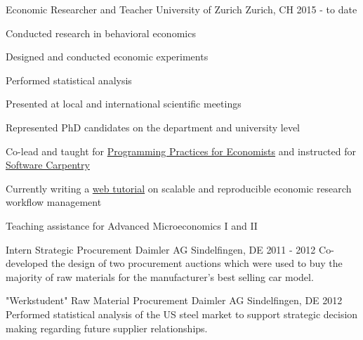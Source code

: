
\begin{section}[Experience]

  \entry%
  {Economic Researcher and Teacher} %
  {University of Zurich} %
  {Zurich, CH} %
  {2015 - to date} %
  {%
    \begin{entrylist}
      \item Conducted research in behavioral economics
      \item Designed and conducted economic experiments
      \item Performed statistical analysis
      \item Presented at local and international scientific meetings
      \item Represented PhD candidates on the department and university level
      \item Co-lead and taught for \href{https://pp4rs.github.io/}{ Programming Practices for Economists} and instructed for \href{https://uzhcrs.github.io/2019-02-07-zurich/}{ Software Carpentry}
      \item Currently writing a \href{https://lachlandeer.github.io/snakemake-econ-r-tutorial/}{ web tutorial} on scalable and reproducible economic research workflow management
      \item Teaching assistance for Advanced Microeconomics I and II
    \end{entrylist}
  }%

  \entry%
    {Intern Strategic Procurement} %
    {Daimler AG} %
    {Sindelfingen, DE} %
    {2011 - 2012} %
    {%
     Co-developed the design of two procurement auctions which were used to buy the majority of raw materials for the manufacturer's best selling car model.
    }%

    \entry%
    {"Werkstudent" Raw Material Procurement} %
    {Daimler AG} %
    {Sindelfingen, DE} %
    {2012} %
    {%
    Performed statistical analysis of the US steel market to support strategic decision making regarding future supplier relationships.
    }%
\end{section}

